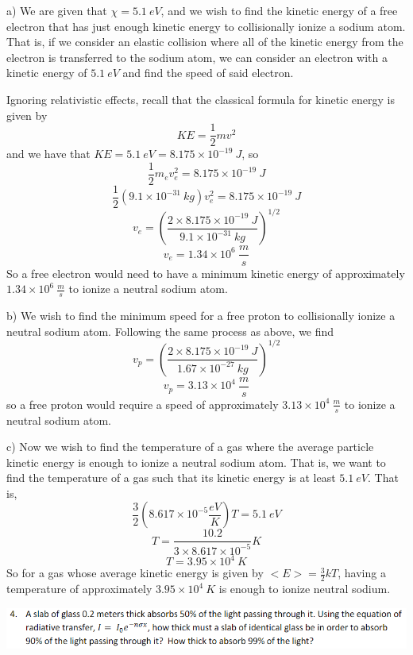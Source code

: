 \documentclass{article}
\begin{document}
a) We are given that $\chi = 5.1 \:eV$, and we wish to find the kinetic energy of a free electron that has just enough kinetic energy to collisionally ionize a sodium atom. That is, if we consider an elastic collision where all of the kinetic energy from the electron is transferred to the sodium atom, we can consider an electron with a kinetic energy of $5.1 \:eV$ and find the speed of said electron.

Ignoring relativistic effects, recall that the classical formula for kinetic energy is given by
\[KE = \frac{1}{2}mv^2\]
and we have that $KE = 5.1 \:eV = 8.175 \times 10^{-19} \:J$, so
\[\frac{1}{2}m_ev_e^2 = 8.175 \times 10^{-19} \:J\]
\[\frac{1}{2}(9.1 \times 10^{-31} \: kg)v_e^2 = 8.175 \times 10^{-19} \:J\]
\[v_e = (\frac{2 \times 8.175 \times 10^{-19} \: J}{9.1 \times 10^{-31} \:kg})^{1/2}\]
\[v_e = 1.34 \times 10^6 \: \frac{m}{s}\]
So a free electron would need to have a minimum kinetic energy of approximately $1.34 \times 10^6 \: \frac{m}{s}$ to ionize a neutral sodium atom.
\newline

b) We wish to find the minimum speed for a free proton to collisionally ionize a neutral sodium atom. Following the same process as above, we find
\[v_p = (\frac{2\times 8.175 \times 10^{-19} \: J}{1.67 \times 10^{-27} \: kg})^{1/2}\]
\[v_p = 3.13 \times 10^4 \: \frac{m}{s}\]
so a free proton would require a speed of approximately $3.13 \times 10^4 \: \frac{m}{s}$ to ionize a neutral sodium atom.
\newline

c) Now we wish to find the temperature of a gas where the average particle kinetic energy is enough to ionize a neutral sodium atom. That is, we want to find the temperature of a gas such that its kinetic energy is at least $5.1 \: eV$.
That is, 
\[\frac{3}{2}(8.617 \times 10^{-5} \frac{eV}{K})T = 5.1 \: eV\]
\[T = \frac{10.2}{3 \times 8.617 \times 10^{-5}}K\]
\[T = 3.95 \times 10^4 \:K\]
So for a gas whose average kinetic energy is given by $<E> = \frac{3}{2}kT$, having a temperature of approximately $3.95 \times 10^4 \:K$ is enough to ionize neutral sodium.
\newline



\includegraphics[scale = 0.8]{probset6prob4.PNG}
\newline
\end{document}
